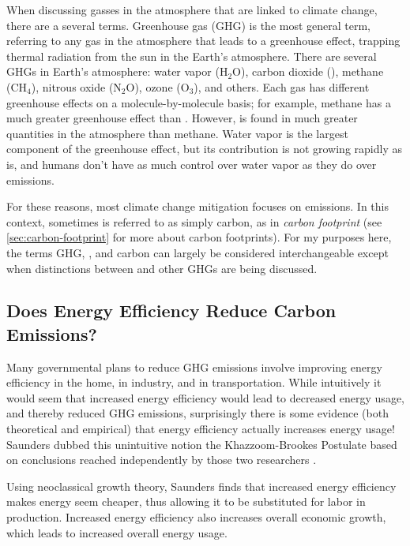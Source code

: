 When discussing gasses in the atmosphere that are linked to climate change, there are a several terms. Greenhouse gas (GHG) is the most general term, referring to any gas in the atmosphere that leads to a greenhouse effect, trapping thermal radiation from the sun in the Earth's atmosphere. There are several GHGs in Earth's atmosphere: water vapor (H$_2$O), carbon dioxide (\COtwo), methane (CH$_4$), nitrous oxide (N$_2$O), ozone (O$_3$), and others. Each gas has different greenhouse effects on a molecule-by-molecule basis; for example, methane has a much greater greenhouse effect than \COtwo.  However, \COtwo is found in much greater quantities in the atmosphere than methane. Water vapor is the largest component of the greenhouse effect, but its contribution is not growing rapidly as \COtwo is, and humans don't have as much control over water vapor as they do over \COtwo emissions.

For these reasons, most climate change mitigation focuses on \COtwo emissions. In this context, sometimes \COtwo is referred to as simply carbon, as in \emph{carbon footprint} (see \autoref{sec:carbon-footprint} for more about carbon footprints). For my purposes here, the terms GHG, \COtwo, and carbon can largely be considered interchangeable except when distinctions between \COtwo and other GHGs are being discussed.

\subsection{Does Energy Efficiency Reduce Carbon Emissions?}

Many governmental plans to reduce GHG emissions involve improving energy efficiency in the home, in industry, and in transportation. While intuitively it would seem that increased energy efficiency would lead to decreased energy usage, and thereby reduced GHG emissions, surprisingly there is some evidence (both theoretical and empirical) that energy efficiency actually increases energy usage! Saunders dubbed this unintuitive notion the Khazzoom-Brookes Postulate based on conclusions reached independently by those two researchers \cite{saunders-1992}. 

Using neoclassical growth theory, Saunders finds that increased energy efficiency makes energy seem cheaper, thus allowing it to be substituted for labor in production. Increased energy efficiency also increases overall economic growth, which leads to increased overall energy usage.

